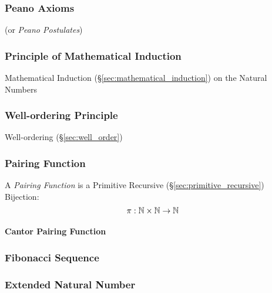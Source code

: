 \subsubsection{Peano Axioms}\label{sec:peano_axioms}

(or \emph{Peano Postulates})



\subsubsection{Principle of Mathematical Induction}
\label{sec:induction_principle}

Mathematical Induction (\S\ref{sec:mathematical_induction}) on the
Natural Numbers



\subsubsection{Well-ordering Principle}\label{sec:wellordering_principle}

Well-ordering (\S\ref{sec:well_order})



\subsubsection{Pairing Function}\label{sec:pairing_function}

A \emph{Pairing Function} is a Primitive Recursive
(\S\ref{sec:primitive_recursive}) Bijection:
\[
  \pi : \mathbb{N} \times \mathbb{N} \rightarrow \mathbb{N}
\]



\paragraph{Cantor Pairing Function}\label{sec:cantor_pairing}\hfill



\subsubsection{Fibonacci Sequence}\label{sec:fibonacci_sequence}

\subsubsection{Extended Natural Number}\label{sec:extended_natural}



